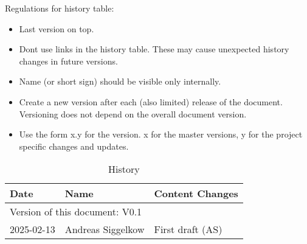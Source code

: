 Regulations for history table:
\begin{itemize}
  \item Last version on top.
  \item Dont use links in the history table. These may cause unexpected history changes in future versions.
  \item Name (or short sign) should be visible only internally.
  \item Create a new version after each (also limited) release of the document. Versioning does not depend on the overall document version.
  \item Use the form x.y for the version. x for the master versions, y for the project specific changes and updates.
\end{itemize}

\begin{table}[H]
\caption{History}
\label{tab:gpiohistory01a}
\centering
\begin{tabularx}{\textwidth}{|X |X |X |}
  \hline
  Date & Name & Content Changes \\
  \hline
  \multicolumn{3}{|l|}{Version of this document: V0.1} \\
  \hline
  2025-02-13 & Andreas Siggelkow & First draft (AS) \\
  \hline
\end{tabularx}
\end{table}
